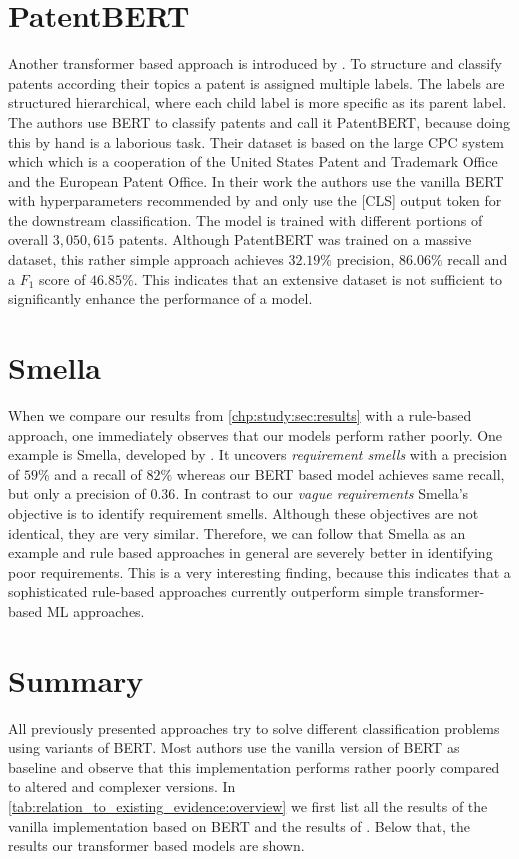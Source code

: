 \section{PatentBERT}
Another transformer based approach is introduced by \textcite{Lee:2019}.
To structure and classify patents according their topics a patent is assigned multiple labels.
The labels are structured hierarchical, where each child label is more specific as its parent label.
The authors use \ac{BERT} to classify patents and call it PatentBERT, because doing this by hand is a laborious task.
Their dataset is based on the large \ac{CPC} system which which is a cooperation of the United States Patent and Trademark Office and the European Patent Office.
In their work the authors use the vanilla \ac{BERT} with hyperparameters recommended by \textcite{Devlin:2018} and only use the [CLS] output token for the downstream classification.
The model is trained with different portions of overall $3,050,615$ patents.
Although PatentBERT was trained on a massive dataset, this rather simple approach achieves $32.19\%$ precision, $86.06\%$ recall and a $F_1$ score of $46.85\%$.
This indicates that an extensive dataset is not sufficient to significantly enhance the performance of a model.

\section{Smella}
When we compare our results from \cref{chp:study:sec:results} with a rule-based approach, one immediately observes that our models perform rather poorly.
One example is Smella, developed by \textcite{Femmer:2017}.
It uncovers \textit{requirement smells} with a precision of $59\%$ and a recall of $82\%$ whereas our \ac{BERT} based model achieves same recall, but only a precision of $0.36$.
In contrast to our \textit{vague requirements} Smella's objective is to identify requirement smells.
Although these objectives are not identical, they are very similar.
Therefore, we can follow that Smella as an example and rule based approaches in general are severely better in identifying poor requirements.
This is a very interesting finding, because this indicates that a sophisticated rule-based approaches currently outperform simple transformer-based \ac{ML} approaches.

\section{Summary}
All previously presented approaches try to solve different classification problems using variants of \ac{BERT}.
Most authors use the vanilla version of \ac{BERT} as baseline and observe that this implementation performs rather poorly compared to altered and complexer versions.
In \cref{tab:relation_to_existing_evidence:overview} we first list all the results of the vanilla implementation based on \ac{BERT} and the results of \textcite{Femmer:2017}.
Below that, the results our transformer based models are shown.

